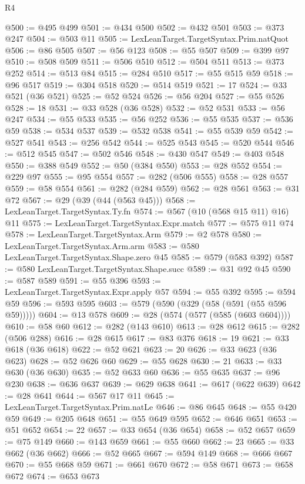 \begin{lexlean}{R4}
\begin{coremodule}
@500 := @495 @499
@501 := @434 @500
@502 := @432 @501
@503 := @373 @247
@504 := @503 @11
@505 := LexLeanTarget.TargetSyntax.Prim.natQuot
@506 := @86 @505
@507 := @56 @123
@508 := @55 @507
@509 := @399 @97
@510 := @508 @509
@511 := @506 @510
@512 := @504 @511
@513 := @373 @252
@514 := @513 @84
@515 := @284 @510
@517 := @55 @515 @59
@518 := @96 @517
@519 := @304 @518
@520 := @514 @519
@521 := 17
@524 := @33 @521 (@36 @521)
@525 := @52 @524
@526 := @56 @204
@527 := @55 @526
@528 := 18
@531 := @33 @528 (@36 @528)
@532 := @52 @531
@533 := @56 @247
@534 := @55 @533
@535 := @56 @252
@536 := @55 @535
@537 := @536 @59
@538 := @534 @537
@539 := @532 @538
@541 := @55 @539 @59
@542 := @527 @541
@543 := @256 @542
@544 := @525 @543
@545 := @520 @544
@546 := @512 @545
@547 := @502 @546
@548 := @430 @547
@549 := @403 @548
@550 := @388 @549
@552 := @50 (@384 @550)
@553 := @28 @552
@554 := @229 @97
@555 := @95 @554
@557 := @282 (@506 @555)
@558 := @28 @557
@559 := @58 @554
@561 := @282 (@284 @559)
@562 := @28 @561
@563 := @31 @72
@567 := @29 (@39 (@44 (@563 @45)))
@568 := LexLeanTarget.TargetSyntax.Ty.fn
@574 := @567 (@10 (@568 @15 @11) @16) @11
@575 := LexLeanTarget.TargetSyntax.Expr.match
@577 := @575 @11 @74
@578 := LexLeanTarget.TargetSyntax.Arm
@579 := @2 @578
@580 := LexLeanTarget.TargetSyntax.Arm.arm
@583 := @580 LexLeanTarget.TargetSyntax.Shape.zero @45
@585 := @579 (@583 @392)
@587 := @580 LexLeanTarget.TargetSyntax.Shape.succ
@589 := @31 @92 @45
@590 := @587 @589
@591 := @55 @396
@593 := LexLeanTarget.TargetSyntax.Expr.apply @57
@594 := @55 @392
@595 := @594 @59
@596 := @593 @595
@603 := @579 (@590 (@329 (@58 (@591 (@55 @596 @59)))))
@604 := @13 @578
@609 := @28 (@574 (@577 (@585 (@603 @604))))
@610 := @58 @60
@612 := @282 (@143 @610)
@613 := @28 @612
@615 := @282 (@506 @288)
@616 := @28 @615
@617 := @83 @376
@618 := 19
@621 := @33 @618 (@36 @618)
@622 := @52 @621
@623 := 20
@626 := @33 @623 (@36 @623)
@628 := @52 @626 @60
@629 := @55 @628
@630 := 21
@633 := @33 @630 (@36 @630)
@635 := @52 @633 @60
@636 := @55 @635
@637 := @96 @230
@638 := @636 @637
@639 := @629 @638
@641 := @617 (@622 @639)
@642 := @28 @641
@644 := @567 @17 @11
@645 := LexLeanTarget.TargetSyntax.Prim.natLe
@646 := @86 @645
@648 := @55 @420 @59
@649 := @205 @648
@651 := @55 @649 @595
@652 := @646 @651
@653 := @51 @652
@654 := 22
@657 := @33 @654 (@36 @654)
@658 := @52 @657
@659 := @75 @149
@660 := @143 @659
@661 := @55 @660
@662 := 23
@665 := @33 @662 (@36 @662)
@666 := @52 @665
@667 := @594 @149
@668 := @666 @667
@670 := @55 @668 @59
@671 := @661 @670
@672 := @58 @671
@673 := @658 @672
@674 := @653 @673

\end{coremodule}
\end{lexlean}
